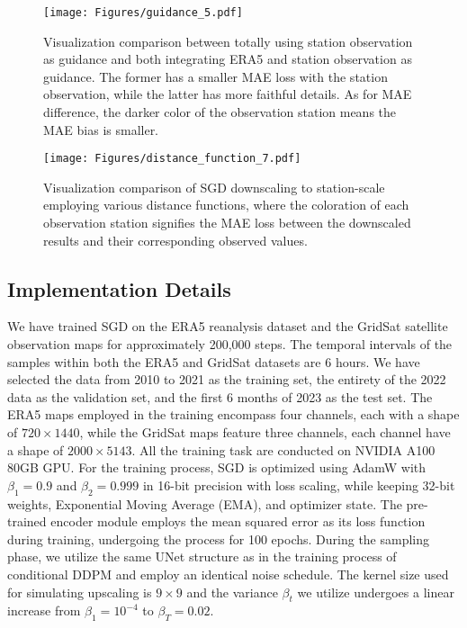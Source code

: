 \begin{figure}[t]
    \centering
\texttt{[image: Figures/guidance\_5.pdf]}
    \vspace{-1.0cm}
    \caption{
Visualization comparison between totally using station observation as guidance and both integrating ERA5 and station observation as guidance. 
The former has a smaller MAE loss with the station observation, while the latter has more faithful details. 
As for MAE difference, the darker color of the observation station means the MAE bias is smaller. 
}
    \label{fig:guidance}
\vspace{-0.5cm}
\end{figure}

\begin{figure*}[t]
    \centering
\texttt{[image: Figures/distance\_function\_7.pdf]}
\vspace{-1cm}
    \caption{Visualization comparison of SGD downscaling to station-scale employing various distance functions, where the coloration of each observation station signifies the MAE loss between the downscaled results and their corresponding observed values. }
    \label{fig:distance_function}
\vspace{-0.5cm}
\end{figure*}


\subsection{Implementation Details}
We have trained SGD on the ERA5 reanalysis dataset and the GridSat satellite observation maps for approximately 200,000 steps. 
The temporal intervals of the samples within both the ERA5 and GridSat datasets are 6 hours. 
We have selected the data from 2010 to 2021 as the training set, the entirety of the 2022 data as the validation set, and the first 6 months of 2023 as the test set.
The ERA5 maps employed in the training encompass four channels, each with a shape of $720\times1440$, while the GridSat maps feature three channels, each channel have a shape of $2000\times5143$. 
All the training task are conducted on NVIDIA A100 80GB GPU. 
For the training process, SGD is optimized using AdamW with $\beta_1=0.9$ and $\beta_2=0.999$ in 16-bit precision with loss scaling, while keeping 32-bit weights, Exponential Moving Average (EMA), and optimizer state. 
The pre-trained encoder module employs the mean squared error as its loss function during training, undergoing the process for 100 epochs. 
During the sampling phase, we utilize the same UNet structure as in the training process of conditional DDPM and employ an identical noise schedule. 
The kernel size used for simulating upscaling is $9\times9$ and the variance $\beta_t$ we utilize undergoes a linear increase from $\beta_1=10^{-4}$ to $\beta_T=0.02$. 

